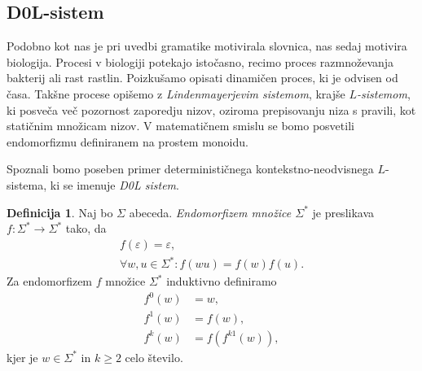 \documentclass{amsart}
\theoremstyle{definition}
\newtheorem{definicija}{Definicija}[section]
\newtheorem{primer}[definicija]{Primer}
\theoremstyle{plain} %
\begin{document}

    

\subsection*{D0L-sistem}

Podobno kot nas je pri uvedbi gramatike motivirala slovnica, nas sedaj motivira biologija. Procesi v biologiji
potekajo istočasno, recimo proces razmnoževanja bakterij ali rast rastlin. Poizkušamo opisati dinamičen proces, ki je odvisen od časa.
Takšne procese opišemo z \textit{Lindenmayerjevim sistemom}, krajše \textit{$ L $-sistemom}, ki posveča več pozornost zaporedju nizov,
oziroma prepisovanju niza s pravili, kot statičnim množicam nizov. V matematičnem smislu se bomo posvetili endomorfizmu
definiranem na prostem monoidu.

Spoznali bomo poseben primer determinističnega kontekstno-neodvisnega $ L $-sistema, ki se imenuje \textit{D0L sistem}.

\begin{definicija}
    
    Naj bo $ \Sigma $ abeceda. \textit{Endomorfizem množice $ \Sigma^* $} je preslikava $ f \colon \Sigma^* \to \Sigma^* $
    tako, da 
    \begin{gather*}
        f(\varepsilon) = \varepsilon, \\
        \forall w,u \in \Sigma^* \colon f(wu) = f(w)f(u).
    \end{gather*}
    Za endomorfizem $ f $ množice $ \Sigma^* $ induktivno definiramo
    \begin{align*}
        f^0(w) &= w, \\
        f^1(w) &= f(w), \\
        f^k(w) &= f(f^{k1}(w)),
    \end{align*}
    kjer je $ w \in \Sigma^* $ in $ k \geq 2 $ celo število.

\end{definicija}
\end{document}
